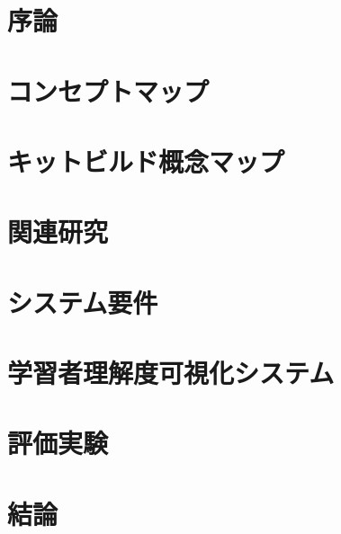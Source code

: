 \addtolength{\headsep}{1cm}
\addtolength{\topmargin}{-2cm}
\addtolength{\textheight}{2cm}


\addtolength{\oddsidemargin}{-1.0cm}
\addtolength{\evensidemargin}{-3.6cm}
\addtolength{\textwidth}{5.5cm}


\pagestyle{empty}

%
%


%
%


%
%


\tableofcontents
\newpage
\setcounter{page}{1}
\pagestyle{plain}

%
%
\chapter{序論}\label{chap:introduction}


%
%
\chapter{コンセプトマップ}\label{chap:conceptmap}


%
%
\chapter{キットビルド概念マップ}\label{chap:kitbuild}


%
%
\chapter{関連研究}\label{chap:refer}


%
%
\chapter{システム要件}\label{chap:content}


%
%
\chapter{学習者理解度可視化システム}\label{chap:system}


%
%
\chapter{評価実験}\label{chap:experiment}


%
%
\chapter{結論}\label{chap:conclusion}


%
%


%
%


%
%


